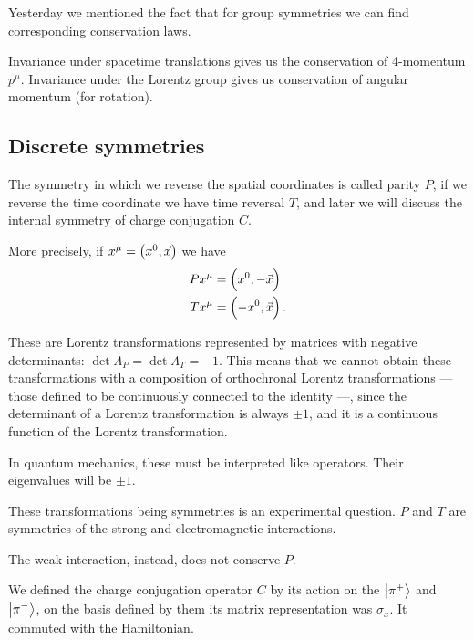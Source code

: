 \documentclass[main.tex]{subfiles}
\begin{document}

Yesterday we mentioned the fact that for group symmetries we can find corresponding conservation laws. 

Invariance under spacetime translations gives us the conservation of 4-momentum \(p^{\mu }\). 
Invariance under the Lorentz group gives us conservation of angular momentum (for rotation).


\subsection{Discrete symmetries}

The symmetry in which we reverse the spatial coordinates is called parity \(P\), if we reverse the time coordinate we have time reversal \(T\), and later we will discuss the internal symmetry of charge conjugation \(C\).

More precisely, if \(x^{\mu } = \qty( x^{0}, \vec{x} )\) we have 
%
\begin{align}
P x^{\mu } &= \qty(x^{0}, - \vec{x})  \\
T x^{\mu } &= \qty(-x^{0}, \vec{x})
\,.
\end{align}

These are Lorentz transformations represented by matrices with negative determinants: \(\det \Lambda_{P} = \det \Lambda_{T} = -1\). 
This means that we cannot obtain these transformations with a composition of orthochronal Lorentz transformations --- those defined to be continuously connected to the identity ---, since the determinant of a Lorentz transformation is always \(\pm 1\), and it is a continuous function of the Lorentz transformation. 

In quantum mechanics, these must be interpreted like operators. 
Their eigenvalues will be \(\pm 1\). 

These transformations being symmetries is an experimental question. \(P\) and \(T\) are symmetries of the strong and electromagnetic interactions. 

The weak interaction, instead, does not conserve \(P\). 

We defined the charge conjugation operator \(C\) by its action on the \(\ket{\pi^{+}}\) and \(\ket{\pi^{-}}\), on the basis defined by them its matrix representation was \(\sigma_{x}\). 
It commuted with the Hamiltonian. 
\end{document}
